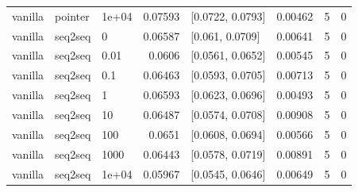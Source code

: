 \documentclass[10pt]{article}
\begin{document}
{\begin{longtable}{lllrlrrr}
vanilla & pointer & 1e+04 & 0.07593 & [0.0722, 0.0793] & 0.00462 & 5 & 0\\
vanilla & seq2seq & 0 & 0.06587 & [0.061, 0.0709] & 0.00641 & 5 & 0\\
vanilla & seq2seq & 0.01 & 0.0606 & [0.0561, 0.0652] & 0.00545 & 5 & 0\\
vanilla & seq2seq & 0.1 & 0.06463 & [0.0593, 0.0705] & 0.00713 & 5 & 0\\
vanilla & seq2seq & 1 & 0.06593 & [0.0623, 0.0696] & 0.00493 & 5 & 0\\
vanilla & seq2seq & 10 & 0.06487 & [0.0574, 0.0708] & 0.00908 & 5 & 0\\
vanilla & seq2seq & 100 & 0.0651 & [0.0608, 0.0694] & 0.00566 & 5 & 0\\
vanilla & seq2seq & 1000 & 0.06443 & [0.0578, 0.0719] & 0.00891 & 5 & 0\\
vanilla & seq2seq & 1e+04 & 0.05967 & [0.0545, 0.0646] & 0.00649 & 5 & 0\\
\bottomrule
\end{longtable}
}
\end{document}
